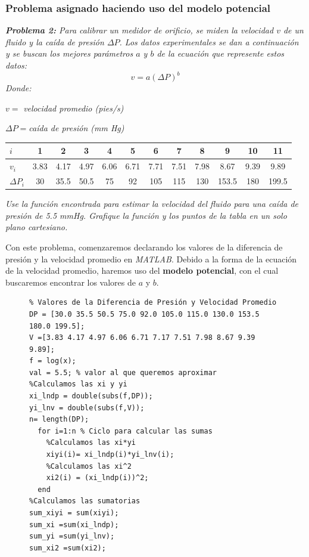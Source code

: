 \documentclass[11pt,letterpaper]{article}
\begin{document}
\subsubsection*{\textcolor{Mahogany}{Problema asignado haciendo uso del modelo potencial}}
\begin{center}
	\textit{\textbf{Problema 2: }Para calibrar un medidor de orificio, se miden la velocidad $v$ de un fluido y la caída de presión $\Delta P$. Los datos experimentales se dan a continuación y se buscan los mejores parámetros $a$ y $b$ de la ecuación que represente estos datos:}
	$$v= a (\Delta P)^b$$
	\textit{Donde:}
		\par $v =$ \textit{ velocidad promedio (pies/s) }\par $\Delta P =$\textit{caída de presión (mm Hg)}\linebreak \par
	\begin{tabular}{l|ccccccccccc}
		\hline 
		$i$ & 1 & 2 & 3 & 4 & 5 & 6 & 7 & 8 & 9 & 10 & 11 \\ 
		\hline 
		$v_i$ & 3.83 & 4.17 & 4.97 & 6.06 & 6.71 & 7.71 & 7.51 & 7.98 & 8.67 & 9.39 & 9.89 \\ 
		\hline 
		$\Delta P_i$ & 30 & 35.5 & 50.5 & 75 & 92 & 105 & 115 & 130 & 153.5 & 180 & 199.5 \\ 
		\hline 
	\end{tabular} 
	\linebreak\par
	\textit{Use la función encontrada para estimar la velocidad del fluido para una caída de presión de 5.5 mmHg. Grafique la función y los puntos de la tabla en un solo plano cartesiano.}
\end{center}
Con este problema, comenzaremos declarando los valores de la diferencia de presión y la velocidad promedio en \textit{MATLAB}. Debido a la forma de la ecuación de la velocidad promedio, haremos uso del \textbf{modelo potencial}, con el cual buscaremos encontrar los valores de $a$ y $b$.
\begin{figure}[H]
\begin{tcolorbox}[title = Problema 2: Valores y sumas iniciales para linealización]
\begin{verbatim}
% Valores de la Diferencia de Presión y Velocidad Promedio
DP = [30.0 35.5 50.5 75.0 92.0 105.0 115.0 130.0 153.5 180.0 199.5];
V =[3.83 4.17 4.97 6.06 6.71 7.17 7.51 7.98 8.67 9.39 9.89];
f = log(x);
val = 5.5; % valor al que queremos aproximar
%Calculamos las xi y yi
xi_lndp = double(subs(f,DP));
yi_lnv = double(subs(f,V));
n= length(DP);
  for i=1:n % Ciclo para calcular las sumas
    %Calculamos las xi*yi
    xiyi(i)= xi_lndp(i)*yi_lnv(i);
    %Calculamos las xi^2
    xi2(i) = (xi_lndp(i))^2;
  end
%Calculamos las sumatorias
sum_xiyi = sum(xiyi);
sum_xi =sum(xi_lndp);
sum_yi =sum(yi_lnv);
sum_xi2 =sum(xi2);
\end{verbatim}
\end{tcolorbox}
\end{figure}
\end{document}
